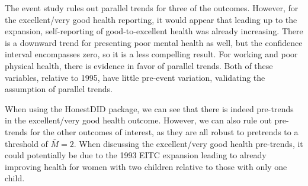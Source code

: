 \documentclass[11pt]{article}
\newcommand{\1}[1]{\mathbb{I}\{#1\}}
\theoremstyle{plain}
\begin{document}
The event study rules out parallel trends for three of the outcomes. However, for the excellent/very good health reporting, it would appear that leading up to the
expansion, self-reporting of good-to-excellent health was already increasing. There is a downward trend for presenting poor mental health as well, but the confidence interval
encompasses zero, so it is a less compelling result. For working and poor physical health, there is evidence in favor of parallel trends. Both of these variables, relative to 1995,
have little pre-event variation, validating the assumption of parallel trends.

When using the HonestDID package, we can see that there is indeed pre-trends in the excellent/very good health outcome. However, we can also rule out pre-trends for the other
outcomes of interest, as they are all robust to pretrends to a threshold of $\bar{M}=2$. When discussing the excellent/very good health pre-trends, it could potentially be
due to the 1993 EITC expansion leading to already improving health for women with two children relative to those with only one child.
\end{document}
